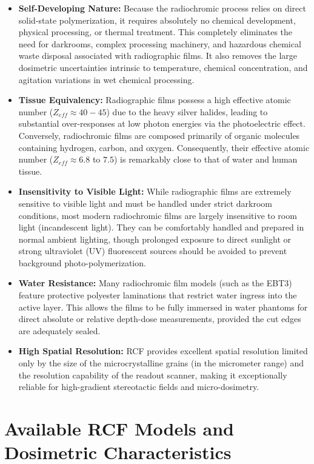 \begin{itemize}
    \item \textbf{Self-Developing Nature:} Because the radiochromic process relies on direct solid-state polymerization, it requires absolutely no chemical development, physical processing, or thermal treatment. This completely eliminates the need for darkrooms, complex processing machinery, and hazardous chemical waste disposal associated with radiographic films. It also removes the large dosimetric uncertainties intrinsic to temperature, chemical concentration, and agitation variations in wet chemical processing.
    \item \textbf{Tissue Equivalency:} Radiographic films possess a high effective atomic number ($Z_{eff} \approx 40-45$) due to the heavy silver halides, leading to substantial over-responses at low photon energies via the photoelectric effect. Conversely, radiochromic films are composed primarily of organic molecules containing hydrogen, carbon, and oxygen. Consequently, their effective atomic number ($Z_{eff} \approx 6.8$ to $7.5$) is remarkably close to that of water and human tissue.
    \item \textbf{Insensitivity to Visible Light:} While radiographic films are extremely sensitive to visible light and must be handled under strict darkroom conditions, most modern radiochromic films are largely insensitive to room light (incandescent light). They can be comfortably handled and prepared in normal ambient lighting, though prolonged exposure to direct sunlight or strong ultraviolet (UV) fluorescent sources should be avoided to prevent background photo-polymerization.
    \item \textbf{Water Resistance:} Many radiochromic film models (such as the EBT3) feature protective polyester laminations that restrict water ingress into the active layer. This allows the films to be fully immersed in water phantoms for direct absolute or relative depth-dose measurements, provided the cut edges are adequately sealed.
    \item \textbf{High Spatial Resolution:} RCF provides excellent spatial resolution limited only by the size of the microcrystalline grains (in the micrometer range) and the resolution capability of the readout scanner, making it exceptionally reliable for high-gradient stereotactic fields and micro-dosimetry.
\end{itemize}

\section{Available RCF Models and Dosimetric Characteristics}

